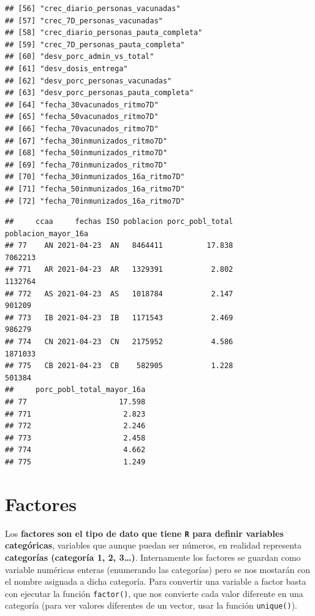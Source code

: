 \documentclass[11pt,]{book}
\newenvironment{Shaded}{\begin{snugshade}}{\end{snugshade}}
\newcommand{\DataTypeTok}[1]{\textcolor[rgb]{0.27,0.27,0.27}{#1}}
\newcommand{\DecValTok}[1]{\textcolor[rgb]{0.06,0.06,0.06}{#1}}
\newcommand{\KeywordTok}[1]{\textcolor[rgb]{0.27,0.27,0.27}{\textbf{#1}}}
\newcommand{\NormalTok}[1]{#1}
\newcommand{\OperatorTok}[1]{\textcolor[rgb]{0.43,0.43,0.43}{\textbf{#1}}}
\newcommand{\StringTok}[1]{\textcolor[rgb]{0.5,0.5,0.5}{#1}}
\begin{document}
\begin{verbatim}
## [56] "crec_diario_personas_vacunadas"      
## [57] "crec_7D_personas_vacunadas"          
## [58] "crec_diario_personas_pauta_completa" 
## [59] "crec_7D_personas_pauta_completa"     
## [60] "desv_porc_admin_vs_total"            
## [61] "desv_dosis_entrega"                  
## [62] "desv_porc_personas_vacunadas"        
## [63] "desv_porc_personas_pauta_completa"   
## [64] "fecha_30vacunados_ritmo7D"           
## [65] "fecha_50vacunados_ritmo7D"           
## [66] "fecha_70vacunados_ritmo7D"           
## [67] "fecha_30inmunizados_ritmo7D"         
## [68] "fecha_50inmunizados_ritmo7D"         
## [69] "fecha_70inmunizados_ritmo7D"         
## [70] "fecha_30inmunizados_16a_ritmo7D"     
## [71] "fecha_50inmunizados_16a_ritmo7D"     
## [72] "fecha_70inmunizados_16a_ritmo7D"
\end{verbatim}

\begin{Shaded}
\end{Shaded}

\begin{verbatim}
##     ccaa     fechas ISO poblacion porc_pobl_total poblacion_mayor_16a
## 77    AN 2021-04-23  AN   8464411          17.838             7062213
## 771   AR 2021-04-23  AR   1329391           2.802             1132764
## 772   AS 2021-04-23  AS   1018784           2.147              901209
## 773   IB 2021-04-23  IB   1171543           2.469              986279
## 774   CN 2021-04-23  CN   2175952           4.586             1871033
## 775   CB 2021-04-23  CB    582905           1.228              501384
##     porc_pobl_total_mayor_16a
## 77                     17.598
## 771                     2.823
## 772                     2.246
## 773                     2.458
## 774                     4.662
## 775                     1.249
\end{verbatim}

\hypertarget{factores}{%
\section{Factores}\label{factores}}

Los \textbf{factores son el tipo de dato que tiene \texttt{R} para definir variables categóricas}, variables que aunque puedan ser números, en realidad representa \textbf{categorías (categoría 1, 2, 3\ldots{})}. Internamente los factores se guardan como variable numéricas enteras (enumerando las categorías) pero se nos mostarán con el nombre asignada a dicha categoría. Para convertir una variable a factor basta con ejecutar la función \texttt{factor()}, que nos convierte cada valor diferente en una categoría (para ver valores diferentes de un vector, usar la función \texttt{unique()}).
\end{document}

